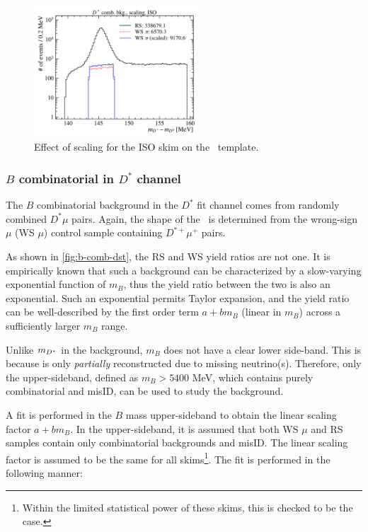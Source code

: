 \begin{figure}[!htb]
    \centering
    \includegraphics[width=0.55\textwidth]{figs-fit-fit-templates/data-driven-plots/dst_comb/fit_dst_comb_scaled_comp_iso_log.pdf}
    \caption{
        Effect of scaling for the ISO skim on the \DstComb\ template.
    }
    \label{fig:dst-comb-scale}
\end{figure}

\subsubsection{$B$ combinatorial in $D^*$ channel}
\label{b-comb-dst}

The $B$ combinatorial background in the $D^*$ fit channel comes from randomly
combined $D^* \mu$ pairs.
Again, the shape of the \BComb\ is determined from the wrong-sign $\mu$ (WS
$\mu$) control sample containing $D^{*+} \mu^+$ pairs.

As shown in \cref{fig:b-comb-dst},
the RS and WS \muon yield ratios are not one.
It is empirically known that such a background can be characterized by a
slow-varying exponential function of $m_B$,
thus the yield ratio between the two is also an exponential.
Such an exponential permits Taylor expansion,
and the yield ratio can be well-described by the first order term
$a + b m_B$ (linear in $m_B$) across a sufficiently larger $m_B$
range.

Unlike $m_{{D}^*}$ in the \DstComb background,
$m_B$ does not have a clear lower side-band.
This is because \B is only \emph{partially} reconstructed
due to missing neutrino(s).
Therefore, only the upper-sideband, defined as $m_B > 5400$ MeV,
which contains purely combinatorial and misID, can be used to
study the \BComb background.

A fit is performed in the $B$ mass upper-sideband to obtain
the linear scaling factor $a + b m_B$.
In the upper-sideband, it is assumed that both WS $\mu$ and RS samples contain
only combinatorial backgrounds and misID.
The linear scaling factor is assumed to be the same for all skims\footnote{
    Within the limited statistical power of these skims,
    this is checked to be the case.
}.
The fit is performed in the following manner:

